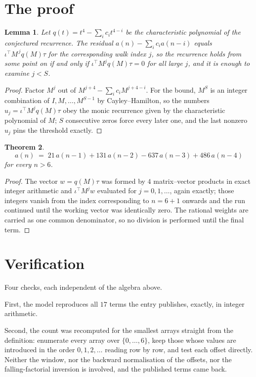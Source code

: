 \documentclass[11pt,a4paper]{article}
\theoremstyle{plain}
\newtheorem{theorem}{Theorem}
\newtheorem{lemma}[theorem]{Lemma}
\theoremstyle{definition}
\begin{document}
\section{The proof}

\begin{lemma}\label{lem:crit}
Let $q(t)=t^{4}-\sum_i c_it^{4-i}$ be the characteristic polynomial of the
conjectured recurrence. The residual $a(n)-\sum_ic_ia(n-i)$ equals
$\iota^{\!\top}M^{\,j}q(M)\tau$ for the corresponding walk index $j$, so the recurrence
holds from some point on if and only if $\iota^{\!\top}M^{j}q(M)\tau=0$ for all large $j$,
and it is enough to examine $j<S$.
\end{lemma}

\begin{proof}
Factor $M^{j}$ out of $M^{j+4}-\sum_ic_iM^{j+4-i}$. For the bound, $M^{S}$
is an integer combination of $I,M,\dots,M^{S-1}$ by Cayley--Hamilton, so the numbers
$u_j=\iota^{\!\top}M^{j}q(M)\tau$ obey the monic recurrence given by the characteristic
polynomial of $M$; $S$ consecutive zeros force every later one, and the last nonzero $u_j$
pins the threshold exactly.
\end{proof}

\begin{theorem}
\[
a(n)\;=\;21\,a(n-1) + 131\,a(n-2) - 637\,a(n-3) + 486\,a(n-4)
\]
for every $n>6$.
\end{theorem}

\begin{proof}
The vector $w=q(M)\tau$ was formed by $4$ matrix--vector products in exact integer
arithmetic and $\iota^{\!\top}M^{j}w$ evaluated for $j=0,1,\dots$, again exactly; those
integers vanish from the index corresponding to $n=6+1$ onwards and the run continued
until the working vector was identically zero. The rational weights are carried as one common
denominator, so no division is performed until the final term.
\end{proof}

\section{Verification}

Four checks, each independent of the algebra above.

First, the model reproduces all $17$ terms the entry publishes, exactly, in integer
arithmetic.

Second, the count was recomputed for the smallest arrays straight from the definition:
enumerate every array over $\{0,\dots,6\}$, keep those whose values are introduced in the
order $0,1,2,\dots$ reading row by row, and test each offset directly. Neither the window, nor
the backward normalisation of the offsets, nor the falling-factorial inversion is involved, and
the published terms came back.
\end{document}
